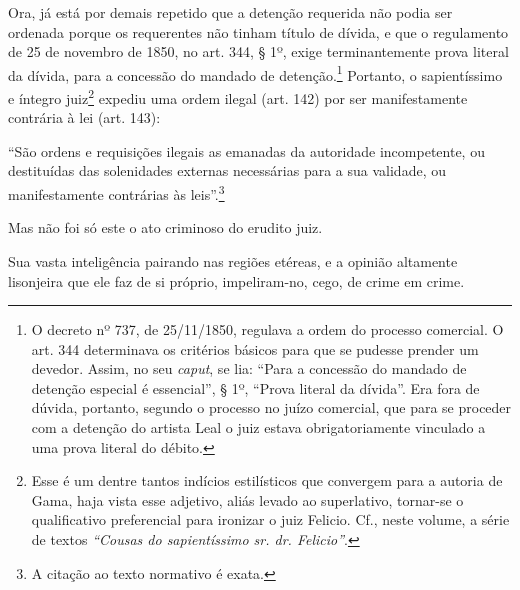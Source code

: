 Ora, já está por demais repetido que a detenção requerida não podia ser
ordenada porque os requerentes não tinham título de dívida, e que o
regulamento de 25 de novembro de 1850, no art. 344, § 1º, exige
terminantemente prova literal da dívida, para a concessão do mandado de
detenção.\footnote{ O decreto nº 737, de 25/11/1850, regulava a ordem
  do processo comercial. O art. 344 determinava os critérios básicos
  para que se pudesse prender um devedor. Assim, no seu \emph{caput}, se
  lia: ``Para a concessão do mandado de detenção especial é essencial'', §
  1º, ``Prova literal da dívida''. Era fora de dúvida, portanto, segundo o
  processo no juízo comercial, que para se proceder com a detenção do
  artista Leal o juiz estava obrigatoriamente vinculado a uma prova
  literal do débito.} Portanto, o sapientíssimo e íntegro
juiz\footnote{ Esse é um dentre tantos indícios estilísticos que
  convergem para a autoria de Gama, haja vista esse adjetivo, aliás
  levado ao superlativo, tornar-se o qualificativo preferencial para
  ironizar o juiz Felicio. Cf., neste volume, a série de textos
  \emph{``Cousas do sapientíssimo sr. dr. Felicio''}.} expediu uma ordem
ilegal (art. 142) por ser manifestamente contrária à lei (art. 143):

``São ordens e requisições ilegais as emanadas da autoridade
incompetente, ou destituídas das solenidades externas necessárias para a
sua validade, ou manifestamente contrárias às leis''.\footnote{ A
  citação ao texto normativo é exata.}

Mas não foi só este o ato criminoso do erudito juiz.

Sua vasta inteligência pairando nas regiões etéreas, e a opinião
altamente lisonjeira que ele faz de si próprio, impeliram-no, cego, de
crime em crime.

